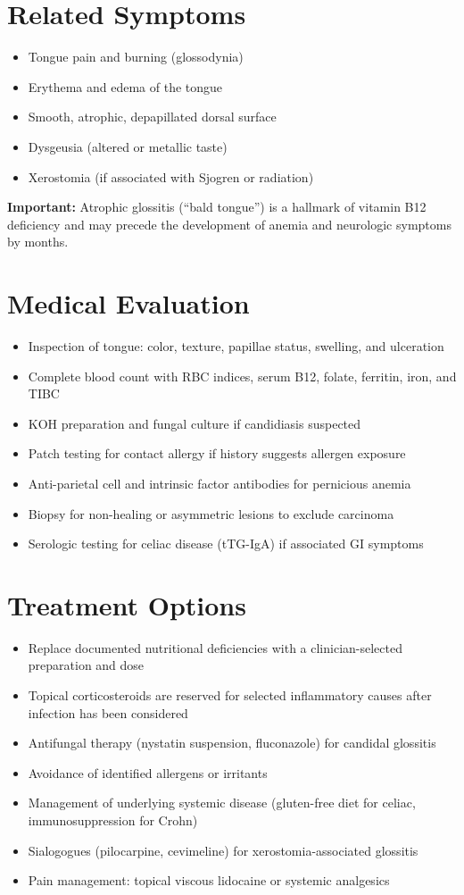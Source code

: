 \section*{Related Symptoms}
\begin{itemize}
  \item Tongue pain and burning (glossodynia)
  \item Erythema and edema of the tongue
  \item Smooth, atrophic, depapillated dorsal surface
  \item Dysgeusia (altered or metallic taste)
  \item Xerostomia (if associated with Sjogren or radiation)
\end{itemize}
\textbf{Important:} Atrophic glossitis (``bald tongue'') is a hallmark of vitamin B12 deficiency and may precede the development of anemia and neurologic symptoms by months.

\section*{Medical Evaluation}
\begin{itemize}
  \item Inspection of tongue: color, texture, papillae status, swelling, and ulceration
  \item Complete blood count with RBC indices, serum B12, folate, ferritin, iron, and TIBC
  \item KOH preparation and fungal culture if candidiasis suspected
  \item Patch testing for contact allergy if history suggests allergen exposure
  \item Anti-parietal cell and intrinsic factor antibodies for pernicious anemia
  \item Biopsy for non-healing or asymmetric lesions to exclude carcinoma
  \item Serologic testing for celiac disease (tTG-IgA) if associated GI symptoms
\end{itemize}

\section*{Treatment Options}
\begin{itemize}
  \item Replace documented nutritional deficiencies with a clinician-selected preparation and dose
  \item Topical corticosteroids are reserved for selected inflammatory causes after infection has been considered
  \item Antifungal therapy (nystatin suspension, fluconazole) for candidal glossitis
  \item Avoidance of identified allergens or irritants
  \item Management of underlying systemic disease (gluten-free diet for celiac, immunosuppression for Crohn)
  \item Sialogogues (pilocarpine, cevimeline) for xerostomia-associated glossitis
  \item Pain management: topical viscous lidocaine or systemic analgesics
\end{itemize}

